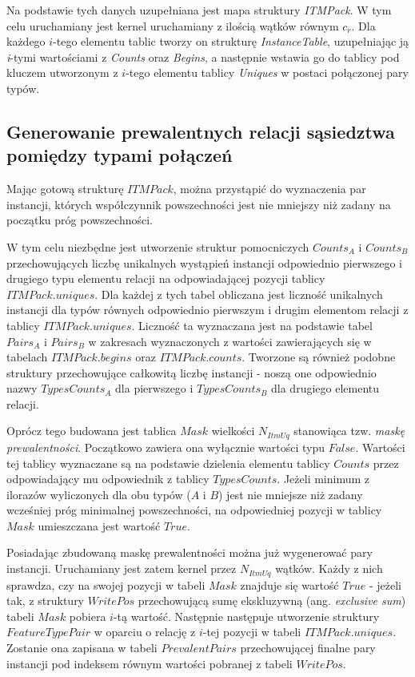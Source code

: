 \documentclass[12pt]{article}
\begin{document}
Na podstawie tych danych uzupełniana jest mapa struktury \textit{ITMPack}. W tym celu uruchamiany jest kernel uruchamiany z ilością wątków równym $ c_{r} $. Dla każdego $ i $-tego elementu tablic tworzy on strukturę \textit{InstanceTable}, uzupełniając ją \textit{i}-tymi wartościami z \textit{Counts} oraz \textit{Begins}, a następnie wstawia go do tablicy pod kluczem utworzonym z $i$-tego elementu tablicy \textit{Uniques} w postaci połączonej pary typów. 

\subsection{Generowanie prewalentnych relacji sąsiedztwa pomiędzy typami połączeń}

Mając gotową strukturę $ ITMPack $, można przystąpić do wyznaczenia par instancji, których współczynnik powszechności jest nie mniejszy niż zadany na początku próg powszechności. 

W tym celu niezbędne jest utworzenie struktur pomocniczych $ Counts_{A} $ i $ Counts_{B} $ przechowujących liczbę unikalnych wystąpień instancji odpowiednio pierwszego i drugiego typu elementu relacji na odpowiadającej pozycji tablicy $ ITMPack.uniques $. Dla każdej z tych tabel obliczana jest liczność unikalnych instancji dla typów równych odpowiednio pierwszym i drugim elementom relacji z tablicy \linebreak $ ITMPack.uniques $. Liczność ta wyznaczana jest na podstawie tabel $ Pairs_{A} $ i $ Pairs_{B} $ w zakresach wyznaczonych z wartości zawierających się w tabelach $ ITMPack.begins $ oraz $ ITMPack.counts $. Tworzone są również podobne struktury przechowujące całkowitą liczbę instancji - noszą one odpowiednio nazwy $ TypesCounts_{A} $ dla pierwszego i $ TypesCounts_{B} $ dla drugiego elementu relacji.

Oprócz tego budowana jest tablica $ Mask $ wielkości $ N_{ItmUq} $ stanowiąca tzw. \textit{maskę prewalentności}. Początkowo zawiera ona wyłącznie wartości typu $ False $. Wartości tej tablicy wyznaczane są na podstawie dzielenia elementu tablicy $ Counts $ przez odpowiadający mu odpowiednik z tablicy $ TypesCounts $. Jeżeli minimum z ilorazów wyliczonych dla obu typów ($ A $ i $ B $) jest nie mniejsze niż zadany wcześniej próg minimalnej powszechności, na odpowiedniej pozycji w tablicy $ Mask $ umieszczana jest wartość $ True $.

Posiadając zbudowaną maskę prewalentności można już wygenerować pary instancji. Uruchamiany jest zatem kernel przez $ N_{ItmUq} $ wątków. Każdy z nich sprawdza, czy na swojej pozycji w tabeli $ Mask $ znajduje się wartość $ True $ - jeżeli tak, z struktury $ WritePos $ przechowującą sumę ekskluzywną (ang. \textit{exclusive sum}) tabeli $ Mask $ pobiera $i$-tą wartość. Następnie następuje utworzenie struktury \linebreak $ FeatureTypePair $ w oparciu o relację z $ i $-tej pozycji w tabeli $ ITMPack.uniques$. Zostanie ona zapisana w tabeli $ PrevalentPairs $ przechowującej finalne pary instancji pod indeksem równym wartości pobranej z tabeli $ WritePos $.
\end{document}
